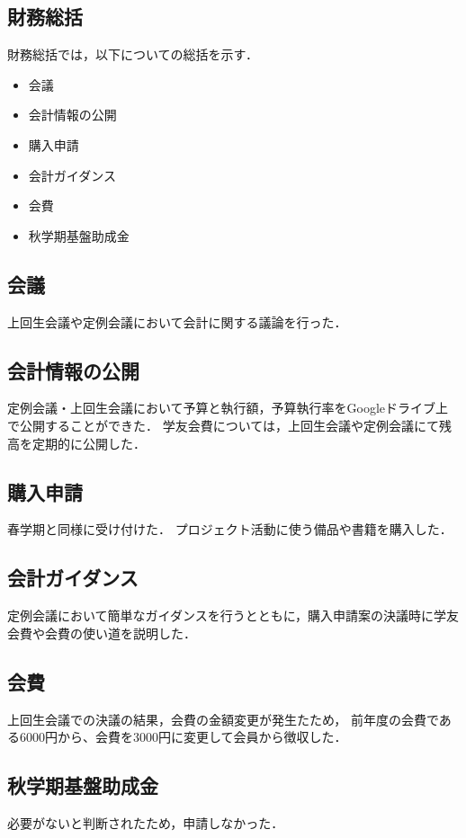 \subsection*{財務総括}


財務総括では，以下についての総括を示す．
\begin{itemize}
  \item 会議
  \item 会計情報の公開
  \item 購入申請
  \item 会計ガイダンス
  \item 会費
  \item 秋学期基盤助成金
\end{itemize}

\subsection*{会議}
上回生会議や定例会議において会計に関する議論を行った．

\subsection*{会計情報の公開}
定例会議・上回生会議において予算と執行額，予算執行率をGoogleドライブ上で公開することができた．
学友会費については，上回生会議や定例会議にて残高を定期的に公開した．

\subsection*{購入申請}
春学期と同様に受け付けた．
プロジェクト活動に使う備品や書籍を購入した．

\subsection*{会計ガイダンス}
定例会議において簡単なガイダンスを行うとともに，購入申請案の決議時に学友会費や会費の使い道を説明した．

\subsection*{会費}
上回生会議での決議の結果，会費の金額変更が発生たため，
前年度の会費である6000円から、会費を3000円に変更して会員から徴収した．

\subsection*{秋学期基盤助成金}
必要がないと判断されたため，申請しなかった．
